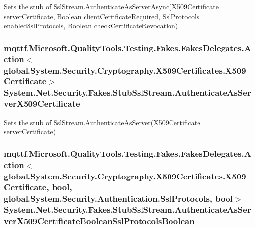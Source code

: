 Sets the stub of Ssl\-Stream.\-Authenticate\-As\-Server\-Async(\-X509\-Certificate server\-Certificate, Boolean client\-Certificate\-Required, Ssl\-Protocols enabled\-Ssl\-Protocols, Boolean check\-Certificate\-Revocation)

\hypertarget{class_system_1_1_net_1_1_security_1_1_fakes_1_1_stub_ssl_stream_a954975550e4f92471da2d35783124ead}{
\subsubsection[{Authenticate\-As\-Server\-X509\-Certificate}]{\setlength{\rightskip}{0pt plus 5cm}mqttf.\-Microsoft.\-Quality\-Tools.\-Testing.\-Fakes.\-Fakes\-Delegates.\-Action$<$global.\-System.\-Security.\-Cryptography.\-X509\-Certificates.\-X509\-Certificate$>$ System.\-Net.\-Security.\-Fakes.\-Stub\-Ssl\-Stream.\-Authenticate\-As\-Server\-X509\-Certificate}}\label{class_system_1_1_net_1_1_security_1_1_fakes_1_1_stub_ssl_stream_a954975550e4f92471da2d35783124ead}


Sets the stub of Ssl\-Stream.\-Authenticate\-As\-Server(\-X509\-Certificate server\-Certificate)

\hypertarget{class_system_1_1_net_1_1_security_1_1_fakes_1_1_stub_ssl_stream_ae60d86a67cd3c105612ba3f1c183343c}{
\subsubsection[{Authenticate\-As\-Server\-X509\-Certificate\-Boolean\-Ssl\-Protocols\-Boolean}]{\setlength{\rightskip}{0pt plus 5cm}mqttf.\-Microsoft.\-Quality\-Tools.\-Testing.\-Fakes.\-Fakes\-Delegates.\-Action$<$global.\-System.\-Security.\-Cryptography.\-X509\-Certificates.\-X509\-Certificate, bool, global.\-System.\-Security.\-Authentication.\-Ssl\-Protocols, bool$>$ System.\-Net.\-Security.\-Fakes.\-Stub\-Ssl\-Stream.\-Authenticate\-As\-Server\-X509\-Certificate\-Boolean\-Ssl\-Protocols\-Boolean}}\label{class_system_1_1_net_1_1_security_1_1_fakes_1_1_stub_ssl_stream_ae60d86a67cd3c105612ba3f1c183343c}


